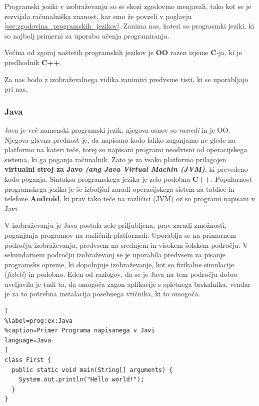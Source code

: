 Programski jeziki v izobraževanju so se skozi zgodovino menjavali,
tako kot se je rezvijala računalniška znanost, kar smo že povzeli v
poglavju \ref{sec:zgodovina_programskih_jezikov}. Zanima nas, kateri so
prograsmki jeziki, ki so najbolj primerni za uporabo učenja
programiranja.

Večina od zgoraj naštetih programskih jezikov je \textbf{OO} razen
izjeme \textbf{C}-ja, ki je predhodnik \textbf{C++}.


Za nas bodo z izobraževalnega vidika zanimivi predvsme tisti, ki se
uporabljajo pri nas.

\subsubsection{Java}
\label{sec:pj:JAVA}

Java je več namenski programski jezik, njegova osnov so \emph{razredi}
in je OO. Njegova glavna prednost je, da napisano kodo lahko zaganjamo
ne glede na platformo na kateri teče, torej so napisani programi
neodvisni od operacijskega sistema, ki ga poganja računalnik. Zato je
za vsako platformo prilagojen \textbf{virtualni stroj za Javo
  \emph{(ang Java Virtual Machin (JVM)}}, ki prevedeno kodo
poganja. Sintaksa programskega jezika je zelo podobna
\textbf{C++}. Popularnost programskega jezika je še izboljšal zaradi
operacijskega sistem za tablice in telefone \textbf{Android}, ki prav
tako teče na različici (JVM) oz so programi napisani v Javi.

V izobraževanju je Java postala zelo priljubljena, prav zaradi
zmožnosti, poganjanja programov na različnih platformah. Uporablja se
na primarnem področju izobraževanja, predvsem na srednjem in visokem
šolskem področju. V sekundarnem področju izobraževanj se je uporabila
predvsem za pisanje programske opreme, ki dopolnjuje izobraževanje,
kot so fizikalne simulacije (\emph{fizleti}) in podobno. Eden od
razlogov, da se je Java na tem področju dobro uveljavila je tudi ta,
da omogoča zagon aplikacije s spletnega brskalnika, vendar je za to
potrebna instalacija posebnega vtičnika, ki to omogoča.

\begin{tcolorbox}[
colframe=sbase2!100,
colback=sbase3!100,
coltitle=sbase00!100!black,
colupper=sbase01!100!black,
fonttitle=\bfseries,
adjusted title=\textbf{Primer programa napisanega v Javi}]


\begin{lstlisting}[
%label=prog:ex:Java
%caption=Primer Programa napisanega v Javi
language=Java
]
class First {
  public static void main(String[] arguments) {
    System.out.println("Hello world!");
  }
}

\end{lstlisting}
\end{tcolorbox}

